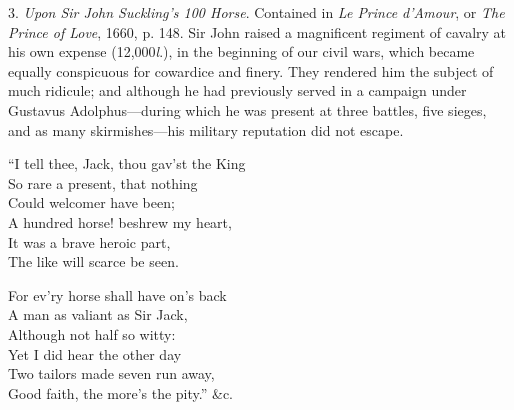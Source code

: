 3. \textit{Upon Sir John Suckling’s 100 Horse}. Contained in \textit{Le Prince d’Amour}, or
\textit{The Prince of Love}, 1660, p. 148. Sir John raised a magnificent regiment of
cavalry at his own expense (12,000\textit{l}.), in the beginning of our civil wars, which
became equally conspicuous for cowardice and finery. They rendered him the
subject of much ridicule; and although he had previously served in a campaign
under Gustavus Adolphus—during which he was present at three battles, five
sieges, and as many skirmishes—his military reputation did not escape.
\begin{dcverse}\begin{patverse}
“I tell thee, Jack, thou gav’st the King\\
So rare a present, that nothing\\
Could welcomer have been;\\
A hundred horse! beshrew my heart,\\
It was a brave heroic part,\\
The like will scarce be seen.
\end{patverse}

\begin{patverse}
For ev’ry horse shall have on’s back\\
A man as valiant as Sir Jack,\\
Although not half so witty:\\
Yet I did hear the other day\\
Two tailors made seven run away,\\
Good faith, the more’s the pity.” \&c.
\end{patverse}
\end{dcverse}
